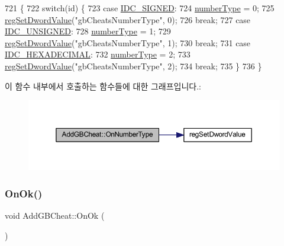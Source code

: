 \begin{DoxyCode}
721 \{
722   \textcolor{keywordflow}{switch}(\textcolor{keywordtype}{id}) \{
723   \textcolor{keywordflow}{case} \mbox{\hyperlink{resource_8h_ae13e01a62e7c40be0e3a93d98d2cd1d3}{IDC\_SIGNED}}:
724     \mbox{\hyperlink{class_add_g_b_cheat_ab49fa34156026418e26edf606aa82b1a}{numberType}} = 0;
725     \mbox{\hyperlink{_reg_8cpp_a758e775489a3fb5c3cc7071fdd5af87e}{regSetDwordValue}}(\textcolor{stringliteral}{"gbCheatsNumberType"}, 0);
726     \textcolor{keywordflow}{break};
727   \textcolor{keywordflow}{case} \mbox{\hyperlink{resource_8h_aeedbb412500d742d9253c77868e55102}{IDC\_UNSIGNED}}:
728     \mbox{\hyperlink{class_add_g_b_cheat_ab49fa34156026418e26edf606aa82b1a}{numberType}} = 1;
729     \mbox{\hyperlink{_reg_8cpp_a758e775489a3fb5c3cc7071fdd5af87e}{regSetDwordValue}}(\textcolor{stringliteral}{"gbCheatsNumberType"}, 1);
730     \textcolor{keywordflow}{break};
731   \textcolor{keywordflow}{case} \mbox{\hyperlink{resource_8h_a41e2d269f242a0163051e37d88a2ee61}{IDC\_HEXADECIMAL}}:
732     \mbox{\hyperlink{class_add_g_b_cheat_ab49fa34156026418e26edf606aa82b1a}{numberType}} = 2;
733     \mbox{\hyperlink{_reg_8cpp_a758e775489a3fb5c3cc7071fdd5af87e}{regSetDwordValue}}(\textcolor{stringliteral}{"gbCheatsNumberType"}, 2);
734     \textcolor{keywordflow}{break};
735   \}
736 \}
\end{DoxyCode}
이 함수 내부에서 호출하는 함수들에 대한 그래프입니다.\+:
\nopagebreak
\begin{figure}[H]
\begin{center}
\leavevmode
\includegraphics[width=350pt]{class_add_g_b_cheat_a1bfddb9d66e182dedc95bf889dc9e6d2_cgraph}
\end{center}
\end{figure}
\mbox{\label{class_add_g_b_cheat_aef6d73f3cdf51e28bbba9f7e14b21941}} 
\subsubsection{\texorpdfstring{On\+Ok()}{OnOk()}}
{\footnotesize\ttfamily void Add\+G\+B\+Cheat\+::\+On\+Ok (\begin{DoxyParamCaption}{ }\end{DoxyParamCaption})\hspace{0.3cm}{\ttfamily [protected]}}




